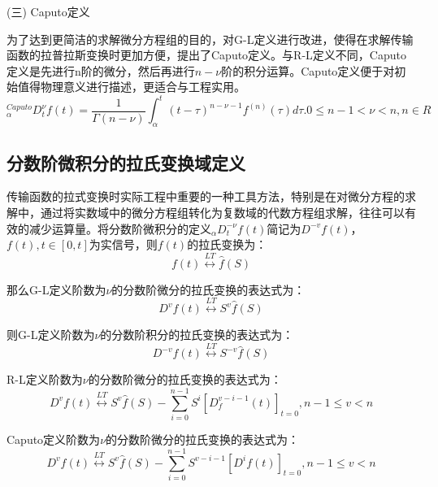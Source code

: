 (三)	Caputo定义

为了达到更简洁的求解微分方程组的目的，对G-L定义进行改进，使得在求解传输函数的拉普拉斯变换时更加方便，提出了Caputo定义。与R-L定义不同，Caputo定义是先进行n阶的微分，然后再进行$n-\nu $阶的积分运算。Caputo定义便于对初始值得物理意义进行描述，更适合与工程实用。
\begin{equation}
{}_{\alpha }^{Caputo}D_{t}^{\nu }f(t)=\frac{1}{\Gamma \left( n-\nu  \right)}\int_{\alpha }^{t}{{{\left( t-\tau  \right)}^{n-\nu -1}}{{f}^{\left( n \right)}}\left( \tau  \right)}d\tau .0\le n-1<\nu <n,n\in R
\end{equation}
\subsection{分数阶微积分的拉氏变换域定义}
传输函数的拉式变换时实际工程中重要的一种工具方法，特别是在对微分方程的求解中，通过将实数域中的微分方程组转化为复数域的代数方程组求解，往往可以有效的减少运算量。将分数阶微积分的定义${}_{\alpha }D_{t}^{-\nu }f(t)$简记为${{D}^{-v}}f(t)$，$f(t),t\in \left[ 0,t \right]$为实信号，则$f(t)$的拉氏变换为：
\begin{equation}
f(t)\overset{LT}{\longleftrightarrow}\widehat{f}\left( S \right)
\end{equation}

那么G-L定义阶数为$\nu $的分数阶微分的拉氏变换的表达式为：
\begin{equation}
{{D}^{v}}f(t)\overset{LT}{\longleftrightarrow}{{S}^{v}}\widehat{f}\left( S \right)
\end{equation}

则G-L定义阶数为$\nu $的分数阶积分的拉氏变换的表达式为：
\begin{equation}
{{D}^{-v}}f(t)\overset{LT}{\longleftrightarrow}{{S}^{-v}}\widehat{f}\left( S \right)
\end{equation}
	 
R-L定义阶数为$\nu $的分数阶微分的拉氏变换的表达式为：
\begin{equation}
{{D}^{v}}f(t)\overset{LT}{\longleftrightarrow}{{S}^{v}}\widehat{f}\left( S \right)-\sum\limits_{i=0}^{n-1}{{{S}^{i}}{{\left[ D_{f}^{v-i-1}\left( t \right) \right]}_{t=0}},n-1\le v<n}
\end{equation}
	 
Caputo定义阶数为$\nu $的分数阶微分的拉氏变换的表达式为：
\begin{equation}
{{D}^{v}}f(t)\overset{LT}{\longleftrightarrow}{{S}^{v}}\widehat{f}\left( S \right)-\sum\limits_{i=0}^{n-1}{{{S}^{v-i-1}}{{\left[ {{D}^{i}}f\left( t \right) \right]}_{t=0}},n-1\le v<n}
\end{equation}
	 
